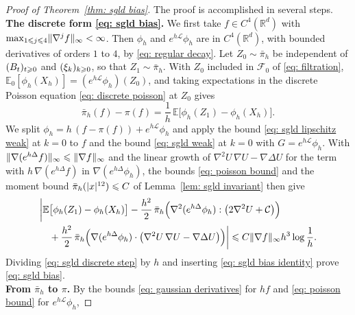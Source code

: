 \begin{proof}[Proof of Theorem~\ref{thm: sgld bias}]
    The proof is accomplished in several steps.\\[6pt]
    \textbf{The discrete form \eqref{eq: sgld bias}.} We first take $f \in C^4(\mathbb R^d)$ with $\max_{1 \leqslant j \leqslant 4} \lVert \nabla^j f \rVert_\infty < \infty$. Then $\phi_h$ and $e^{h\mathcal L} \phi_h$ are in $C^4(\mathbb R^d)$, with bounded derivatives of orders $1$ to $4$, by \eqref{eq: regular decay}. Let $Z_0 \sim \bar\pi_h$ be independent of $(B_t)_{t \geqslant 0}$ and $(\xi_k)_{k \geqslant 0}$, so that $Z_1 \sim \bar\pi_h$. With $Z_0$ included in $\mathcal F_0$ of \eqref{eq: filtration}, $\mathbb E_0[\phi_h(X_h)] = (e^{h\mathcal L} \phi_h)(Z_0)$, and taking expectations in the discrete Poisson equation \eqref{eq: discrete poisson} at $Z_0$ gives
    \begin{equation}
        \bar\pi_h(f) - \pi(f) = \frac1h\, \mathbb E\bigl[ \phi_h(Z_1) - \phi_h(X_h) \bigr] .
        \label{eq: sgld bias identity}
    \end{equation}
    We split $\phi_h = h\, ( f - \pi(f) ) + e^{h\mathcal L} \phi_h$ and apply the bound \eqref{eq: sgld lipschitz weak} at $k = 0$ to $f$ and the bound \eqref{eq: sgld weak} at $k = 0$ with $G = e^{h\mathcal L} \phi_h$. With $\lVert \nabla ( e^{h\Delta} f ) \rVert_\infty \leqslant \lVert \nabla f \rVert_\infty$ and the linear growth of $\nabla^2 U\, \nabla U - \nabla \Delta U$ for the term with $h\, \nabla ( e^{h\Delta} f )$ in $\nabla ( e^{h\Delta} \phi_h )$, the bounds \eqref{eq: poisson bound} and the moment bound $\bar\pi_h(|x|^{12}) \leqslant C$ of Lemma~\ref{lem: sgld invariant} then give
    \begin{equation}
    \begin{aligned}
        & \biggl| \mathbb E\bigl[ \phi_h(Z_1) - \phi_h(X_h) \bigr] - \frac{h^2}{2}\, \bar\pi_h\Bigl( \nabla^2 ( e^{h\Delta} \phi_h ) : \bigl( 2\nabla^2 U + \mathcal C \bigr) \Bigr) \\
        & \quad + \frac{h^2}{2}\, \bar\pi_h\Bigl( \nabla ( e^{h\Delta} \phi_h ) \cdot \bigl( \nabla^2 U\, \nabla U - \nabla \Delta U \bigr) \Bigr) \biggr| \leqslant C \lVert \nabla f \rVert_\infty h^3 \log\frac1h .
    \end{aligned}
        \label{eq: sgld discrete step}
    \end{equation}
    Dividing \eqref{eq: sgld discrete step} by $h$ and inserting \eqref{eq: sgld bias identity} prove \eqref{eq: sgld bias}.\\[6pt]
    \textbf{From $\bar\pi_h$ to $\pi$.} By the bounds \eqref{eq: gaussian derivatives} for $h f$ and \eqref{eq: poisson bound} for $e^{h\mathcal L} \phi_h$,

\end{proof}
